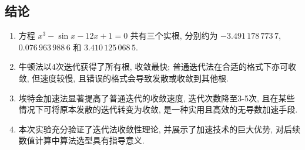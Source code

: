 \documentclass[12pt,a4paper]{ctexart}
\begin{document}
\subsection{结论}
\begin{enumerate}[(1)]
    \item 方程 $x^3-\sin x-12x+1=0$ 共有三个实根, 分别约为 $-3.491\,178\,773\,7$, $0.076\,963\,988\,6$ 和 $3.410\,125\,068\,5$. 
    \item 牛顿法以4次迭代获得了所有根, 收敛最快; 普通迭代法在合适的格式下亦可收敛, 但速度较慢, 且错误的格式会导致发散或收敛到其他根. 
    \item 埃特金加速法显著提高了普通迭代的收敛速度, 迭代次数降至3-5次, 且在某些情况下可将原本发散的迭代转变为收敛, 是一种实用且高效的无导数加速手段. 
    \item 本次实验充分验证了迭代法收敛性理论, 并展示了加速技术的巨大优势, 对后续数值计算中算法选型具有指导意义. 
\end{enumerate}
\end{document}
